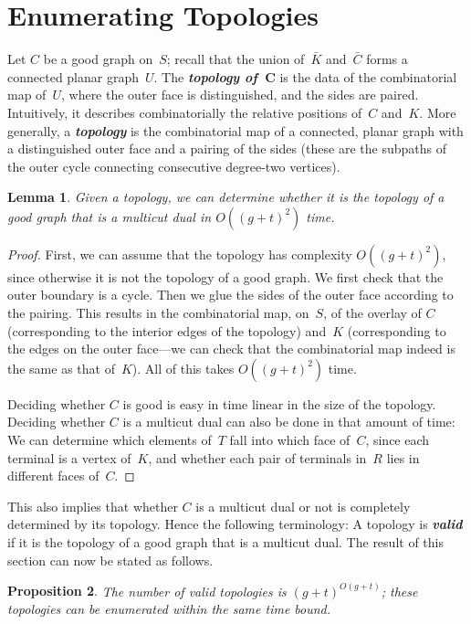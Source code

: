 \documentclass[11pt]{article}
\newcommand{\emphdef}[1]{\textcolor{blueblack}{\textbf{\emph{#1}}}}
\newcommand{\CC}{\ensuremath{\bar{C}}}
\newcommand{\KK}{\ensuremath{\bar{K}}}
\theoremstyle{plain}  \newtheorem{theorem}{Theorem}[section]
\newtheorem{lemma}[theorem]{Lemma}
\newtheorem{proposition}[theorem]{Proposition}
\theoremstyle{definition}
\begin{document}
\section{Enumerating Topologies}\label{S:enum}

Let $C$ be a good graph on~$S$; recall that the union of~$\KK$ and~$\CC$
forms a connected planar graph~$U$.  The \emphdef{topology of~$\bm{C}$} is
the data of the combinatorial map of~$U$, where the outer face is
distinguished, and the sides are paired.  Intuitively, it describes
combinatorially the relative positions of~$C$ and~$K$.  More generally, a
\emphdef{topology} is the combinatorial map of a connected, planar graph
with a distinguished outer face and a pairing of the sides (these are the
subpaths of the outer cycle connecting consecutive degree-two vertices).

\begin{lemma}\label{L:algovalid}
  Given a topology, we can determine whether it is the topology of a good
  graph that is a multicut dual in $O((g+t)^2)$ time.
\end{lemma}
\begin{proof}
  First, we can assume that the topology has complexity $O((g+t)^2)$, since
  otherwise it is not the topology of a good graph.  We first check that
  the outer boundary is a cycle.  Then we glue the sides of the outer face
  according to the pairing.  This results in the combinatorial map, on~$S$,
  of the overlay of $C$ (corresponding to the interior edges of the
  topology) and~$K$ (corresponding to the edges on the outer face---we can
  check that the combinatorial map indeed is the same as that of~$K$).  All
  of this takes $O((g+t)^2)$ time.

  Deciding whether $C$ is good is easy in time linear in the size of the
  topology.  Deciding whether $C$ is a multicut dual can also be done in
  that amount of time: We can determine which elements of~$T$ fall into
  which face of~$C$, since each terminal is a vertex of~$K$, and whether
  each pair of terminals in~$R$ lies in different faces of~$C$.
\end{proof}
This also implies that whether $C$ is a multicut dual or not is completely
determined by its topology.  Hence the following terminology: A topology is
\emphdef{valid} if it is the topology of a good graph that is a multicut
dual.  The result of this section can now be stated as follows.
\begin{proposition}\label{P:enumtop}
  The number of valid topologies is ${(g+t)}^{O(g+t)}$; these topologies
  can be enumerated within the same time bound.
\end{proposition}
\end{document}
